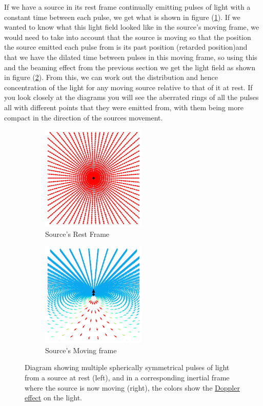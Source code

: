 If we have a source in its rest frame continually emitting pulses of light with a constant time between each pulse, we get what is shown in figure (\ref{fig: multiple emitting pulses rest frame}). If we wanted to know what this light field looked like in the source's moving frame, we would need to take into account that the source is moving so that the position the source emitted each pulse from is its past position (retarded position)and that we have the dilated time between pulses in this moving frame, so using this and the beaming effect from the previous section we get the light field as shown in figure (\ref{fig: multiple emitting pulses moving frame}). From this, we can work out the distribution and hence concentration of the light for any moving source relative to that of it at rest. If you look closely at the diagrams you will see the aberrated rings of all the pulses all with different points that they were emitted from, with them being more compact in the direction of the sources movement.

\begin{figure}[H]
	\begin{subfigure}{.49\textwidth}
		\centering
		\includegraphics[width=5cm]{images/pdf/Field_Rest_Frame.pdf}
		\caption{Source's Rest Frame}
		\label{fig: multiple emitting pulses rest frame}
	\end{subfigure}
	\begin{subfigure}{.49\textwidth}
		\centering
		\includegraphics[width=5cm]{images/pdf/Field_Moving_Frame_Doppler.pdf}
		\caption{Source's Moving frame}
		\label{fig: multiple emitting pulses moving frame}
	\end{subfigure}
	\caption{Diagram showing multiple spherically symmetrical pulses of light from a source at rest (left), and in a corresponding inertial frame where the source is now moving (right), the colors show the \protect\hyperlink{def-doppler-effect}{Doppler effect} on the light.} %
	\label{fig: full field transformation 0}
\end{figure}

